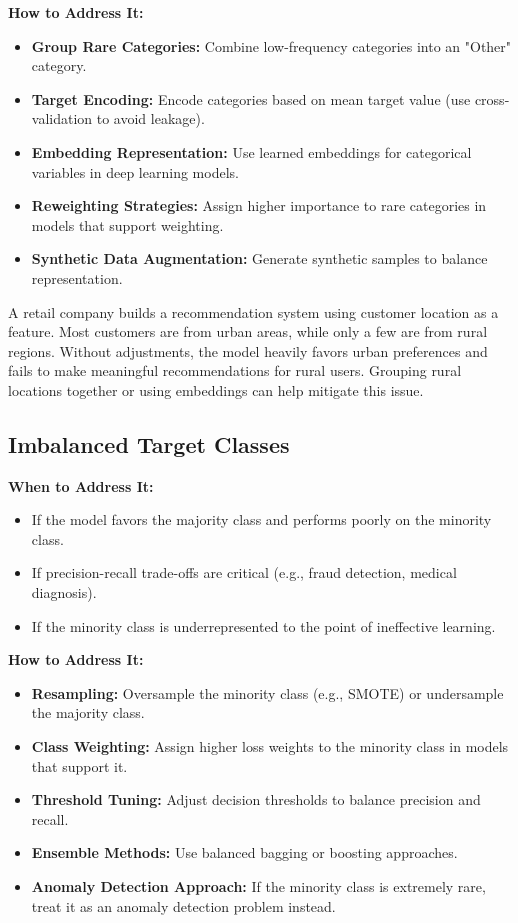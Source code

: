 \documentclass[12pt,openany]{book}
\begin{document}
\textbf{How to Address It:}
\begin{itemize}
    \item \textbf{Group Rare Categories:} Combine low-frequency categories into an "Other" category.
    \item \textbf{Target Encoding:} Encode categories based on mean target value (use cross-validation to avoid leakage).
    \item \textbf{Embedding Representation:} Use learned embeddings for categorical variables in deep learning models.
    \item \textbf{Reweighting Strategies:} Assign higher importance to rare categories in models that support weighting.
    \item \textbf{Synthetic Data Augmentation:} Generate synthetic samples to balance representation.
\end{itemize}

\begin{examplebox}
A retail company builds a recommendation system using customer location as a feature. Most customers are from urban areas, while only a few are from rural regions. Without adjustments, the model heavily favors urban preferences and fails to make meaningful recommendations for rural users. Grouping rural locations together or using embeddings can help mitigate this issue.
\end{examplebox}

\subsection{Imbalanced Target Classes}

\textbf{When to Address It:}
\begin{itemize}
    \item If the model favors the majority class and performs poorly on the minority class.
    \item If precision-recall trade-offs are critical (e.g., fraud detection, medical diagnosis).
    \item If the minority class is underrepresented to the point of ineffective learning.
\end{itemize}

\textbf{How to Address It:}
\begin{itemize}
    \item \textbf{Resampling:} Oversample the minority class (e.g., SMOTE) or undersample the majority class.
    \item \textbf{Class Weighting:} Assign higher loss weights to the minority class in models that support it.
    \item \textbf{Threshold Tuning:} Adjust decision thresholds to balance precision and recall.
    \item \textbf{Ensemble Methods:} Use balanced bagging or boosting approaches.
    \item \textbf{Anomaly Detection Approach:} If the minority class is extremely rare, treat it as an anomaly detection problem instead.
\end{itemize}
\end{document}
